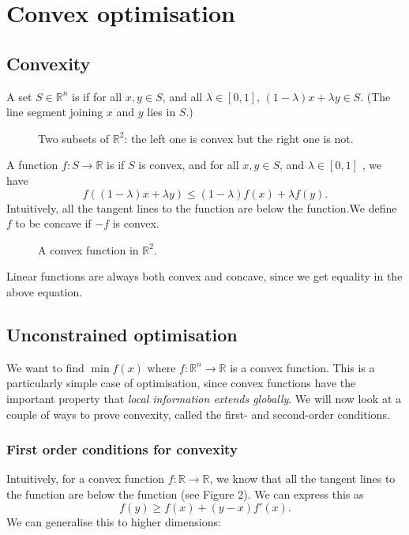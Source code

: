 \documentclass[egregdoesnotlikesansseriftitles,a4paper]{scrartcl}
\begin{document}
\section{Convex optimisation} 
\subsection{Convexity}
\begin{definition*}
	 A set $S \in \mathbb{R}^{n} $ is  if for all $x,y \in S$, and all $\lambda \in [0,1]$, $(1-\lambda)x+\lambda y \in S$. (The line segment joining $x$ and $y$ lies in $S$.)  
	 \begin{figure}[H]
		\centering
		\caption{Two subsets of $\mathbb{R}^{2} $: the left one is convex but the right one is not.}
	\end{figure}
\end{definition*}
\begin{definition*}
	 A function $f:S \rightarrow \mathbb{R}$ is  if $S$ is convex, and for all $x,y \in S$, and $\lambda \in [0,1]$ , we have 
	 \[f((1-\lambda)x+\lambda y)\leq (1-\lambda)f(x)+ \lambda f(y).\] 
	 Intuitively, all the tangent lines to the function are below the function.We define $f$ to be concave if $-f$ is convex.
	 \begin{figure}[H]
		\centering
		\caption{A convex function in $\mathbb{R}^2$.}
	\end{figure}
\end{definition*}
\begin{remark}
	Linear functions are always both convex and concave, since we get equality in the above equation.
\end{remark}

\subsection{Unconstrained optimisation}
We want to find $\min f(x)$ where $f: \mathbb{R}^{n} \rightarrow \mathbb{R}$ is a convex function. This is a particularly simple case of optimisation, since convex functions have the important property that \emph{local information extends globally}. We will now look at a couple of ways to prove convexity, called the first- and second-order conditions.

\subsubsection{First order conditions for convexity}
Intuitively, for a convex function $f:\mathbb{R} \rightarrow \mathbb{R}$, we know that all the tangent lines to the function are below the function (see Figure 2). We can express this as 
\[f(y) \geq f(x)+(y-x)f'(x).\]
We can generalise this to higher dimensions:
\end{document}
